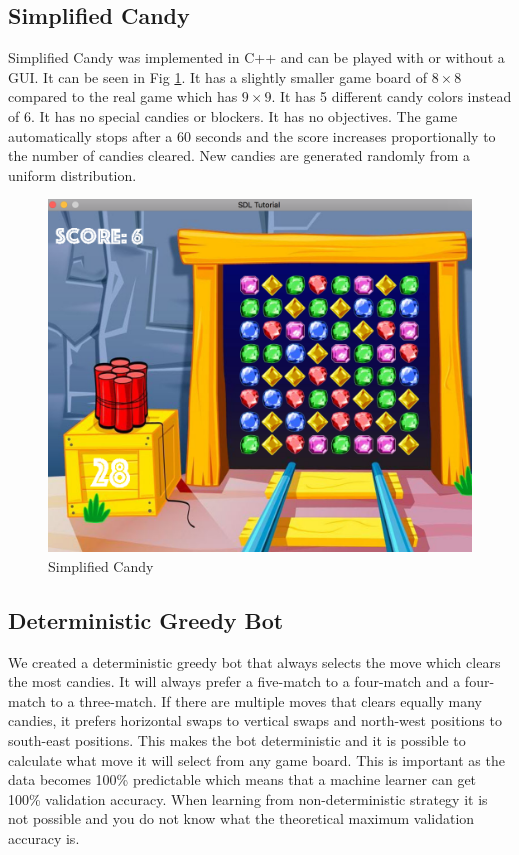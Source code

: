 \documentclass{kththesis}
\begin{document}
\subsection{Simplified Candy}
Simplified Candy was implemented in C++ and can be played with or without a GUI. It can be seen in Fig \ref{fig:candy_small}. It has a slightly smaller game board of $8\times8$ compared to the real game which has $9\times9$. It has 5 different candy colors instead of 6. It has no special candies or blockers. It has no objectives. The game automatically stops after a 60 seconds and the score increases  proportionally to the number of candies cleared. New candies are generated randomly from a uniform distribution. 
\begin{figure}
\centering
\includegraphics[width=\textwidth]{images/candy_small.png}
\caption{Simplified Candy}
\label{fig:candy_small}
\end{figure}

\subsection{Deterministic Greedy Bot}
We created a deterministic greedy bot that always selects the move which clears the most candies. It will always prefer a five-match to a four-match and a four-match to a three-match. If there are multiple moves that clears equally many candies, it prefers horizontal swaps to vertical swaps  and north-west positions to south-east positions. This makes the bot deterministic and it is possible to calculate what move it will select from any game board. This is important as  the data becomes 100\% predictable which means that a machine learner can get 100\% validation accuracy. When learning from non-deterministic strategy it is not possible and you do not know what the theoretical maximum validation accuracy is.
\end{document}
